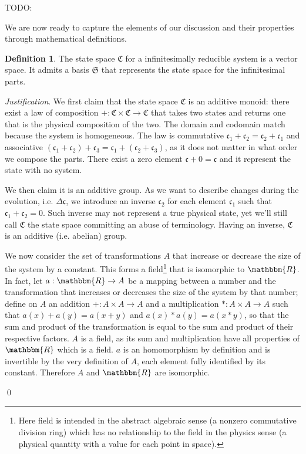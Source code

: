 \documentclass[aps,pra,10pt,twocolumn,floatfix,nofootinbib]{revtex4-1}
\theoremstyle{definition}
\newtheorem{defn}[prop]{Definition}
\newenvironment{justification}{\emph{Justification}.}{\qed}
\begin{document}
TODO: 

We are now ready to capture the elements of our discussion and their properties through mathematical definitions.

\begin{defn}\label{vector space}
The state space $\mathfrak{C}$ for a infinitesimally reducible system is a vector space. It admits a basis $\mathfrak{S}$ that represents the state space for the infinitesimal parts.
\end{defn}

\begin{justification}
We first claim that the state space $\mathfrak{C}$ is an additive monoid: there exist a law of composition $+ : \mathfrak{C} \times \mathfrak{C} \rightarrow \mathfrak{C}$ that takes two states and returns one that is the physical composition of the two. The domain and codomain match because the system is homogeneous. The law is commutative $\mathfrak{c}_1 +\mathfrak{c}_2 = \mathfrak{c}_2+\mathfrak{c}_1$ and associative $(\mathfrak{c}_1 + \mathfrak{c}_2) + \mathfrak{c}_3 = \mathfrak{c}_1 + (\mathfrak{c}_2 + \mathfrak{c}_3)$, as it does not matter in what order we compose the parts. There exist a zero element $\mathfrak{c} + 0 = \mathfrak{c}$ and it represent the state with no system.

We then claim it is an additive group. As we want to describe changes during the evolution, i.e. $\Delta \mathfrak{c}$, we introduce an inverse $\mathfrak{c}_2$ for each element $\mathfrak{c}_1$ such that $\mathfrak{c}_1 + \mathfrak{c}_2 = 0$. Such inverse may not represent a true physical state, yet we'll still call $\mathfrak{C}$ the state space committing an abuse of terminology. Having an inverse, $\mathfrak{C}$ is an additive (i.e. abelian) group.

We now consider the set of transformations $A$ that increase or decrease the size of the system by a constant. This forms a field\footnote{Here field is intended in the abstract algebraic sense (a nonzero commutative division ring) which has no relationship to the field in the physics sense (a physical quantity with a value for each point in space).} that is isomorphic to $\mathbbm{R}$. In fact, let $a: \mathbbm{R} \rightarrow A$ be a mapping between a number and the transformation that increases or decreases the size of the system by that number; define on $A$ an addition $+: A \times A \rightarrow A$ and a multiplication $*: A \times A \rightarrow A$ such that $a(x) + a(y) = a(x+y)$ and $a(x) * a(y) = a(x*y)$, so that the sum and product of the transformation is equal to the sum and product of their respective factors. $A$ is a field, as its sum and multiplication have all properties of $\mathbbm{R}$ which is a field. $a$ is an homomorphism by definition and is invertible by the very definition of $A$, each element fully identified by its constant. Therefore $A$ and $\mathbbm{R}$ are isomorphic.


\end{justification}
\end{document}
